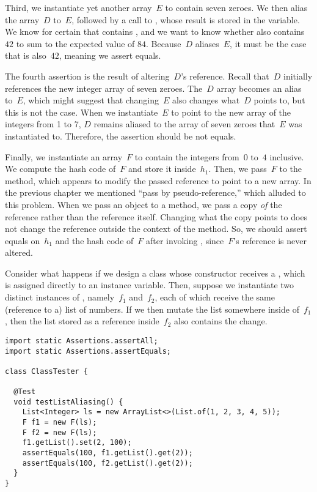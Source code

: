 Third, we instantiate yet another array~$E$ to contain seven zeroes. We then alias the array~$D$ to~$E$, followed by a call to , whose result is stored in the  variable. We know for certain that  contains , and we want to know whether  also contains~$42$ to sum to the expected value of $84$. Because~$D$ aliases~$E$, it must be the case that  is also~$42$, meaning we assert equals.

The fourth assertion is the result of altering~$D$'s reference. Recall that~$D$ initially references the new integer array of seven zeroes. The~$D$ array becomes an alias to~$E$, which might suggest that changing~$E$ also changes what~$D$ points to, but this is not the case. When we instantiate~$E$ to point to the new array of the integers from 1 to 7, $D$ remains aliased to the array of seven zeroes that~$E$ was instantiated to. Therefore, the assertion should be not equals.

Finally, we instantiate an array~$F$ to contain the integers from~$0$ to~$4$ inclusive. We compute the hash code of~$F$ and store it inside~$h_1$. Then, we pass~$F$ to the  method, which appears to modify the passed reference to point to a new array. In the previous chapter we mentioned ``pass by pseudo-reference,'' which alluded to this problem. When we pass an object to a method, we pass a copy \emph{of} the reference rather than the reference itself. Changing what the copy points to does not change the reference outside the context of the  method. So, we should assert equals on~$h_1$ and the hash code of~$F$ after invoking , since~$F$'s reference is never altered.

Consider what happens if we design a class  whose constructor receives a , which is assigned directly to an instance variable. 
Then, suppose we instantiate two distinct instances of , namely~$f_1$ and~$f_2$, each of which receive the same (reference to a) list of numbers. 
If we then mutate the list somewhere inside of~$f_1$, then the list stored as a reference inside~$f_2$ also contains the change.

\newpage
\begin{lstlisting}[language=MyJava]
import static Assertions.assertAll;
import static Assertions.assertEquals;

class ClassTester {

  @Test
  void testListAliasing() {
    List<Integer> ls = new ArrayList<>(List.of(1, 2, 3, 4, 5));
    F f1 = new F(ls);
    F f2 = new F(ls);
    f1.getList().set(2, 100);
    assertEquals(100, f1.getList().get(2));
    assertEquals(100, f2.getList().get(2));
  }
}
\end{lstlisting}

